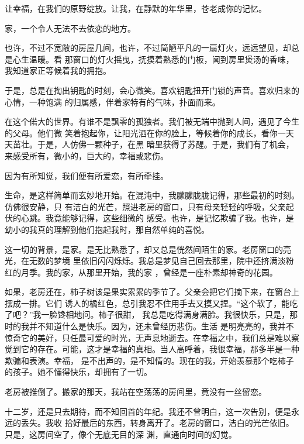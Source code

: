 \documentclass[12pt,a4paper]{article}
\begin{document}
	\endwriting



		让幸福，在我们的原野绽放。让我，在静默的年华里，苍老成你的记忆。

		家，一个令人无法不去依恋的地方。

		也许，不过不宽敞的房屋几间，也许，不过简陋平凡的一扇灯火，远远望见，却总是心生温暖。看
	那窗口的灯火摇曳，抚摸着熟悉的门板，闻到房里煲汤的香味，我知道家正等候着我的拥抱。

		于是，总是在掏出钥匙的时刻，会心微笑。喜欢钥匙扭开门锁的声音。喜欢归来的心情，一种饱满
	的归属感，伴着家特有的气味，扑面而来。

		在这个偌大的世界。有谁不是飘零的孤独者。我们被无端中抛到人间，遇见了今生的父母。他们微
	笑着抱起你，让阳光洒在你的脸上，等候着你的成长，看你一天天茁壮。于是，人仿佛一颗种子，在黑
	暗里获得了苏醒。于是，我们有了机会，来感受所有，微小的，巨大的，幸福或悲伤。

		因为有所知觉，我们便有所爱恋，有所牵挂。

		生命，是这样简单而玄妙地开始。在混沌中，我朦朦胧胧记得，那些最初的时刻。仿佛很安静，只
	有洁白的光芒，照进老房的窗口，只有母亲轻轻的呼吸，父亲起伏的心跳。我竟能够记得，这些细微的
	感受。也许，是记忆欺骗了我。也许，是幼小的我真的理解到他们抱起我时，那自然单纯的喜悦。

		这一切的背景，是家。是无比熟悉了，却又总是恍然间陌生的家。老房窗口的亮光，在无数的梦境
	里依旧闪闪烁烁。我总是梦见自己回去那里，院中还挤满淡粉红的月季。我的家，从那里开始，我的家
	，曾经是一座朴素却神奇的花园。

		如果，老房还在，柿子树该是果实累累的季节了。父亲会把它们摘下来，在窗台上摆成一排。它们
	诱人的橘红色，总引我忍不住用手去又摸又捏。“这个软了，能吃了吧？”我一脸馋相地问。柿子很甜，
	我总是吃得满身满脸。我很快乐，只是，那时的我并不知道什么是快乐。因为，还未曾经历悲伤。生活
	是明亮亮的，我并不惊奇它的美好，只任最可爱的时光，无声息地逝去。在幸福之中，我们总是难以察
	觉到它的存在。可能，这才是幸福的真相。当人高呼着，我很幸福，那多半是一种欺骗和表演。幸福，
	是不出声的，是不知情的。现在的我，开始羡慕那个吃柿子的孩子。她不懂得快乐，却拥有了一切。

		老房被推倒了。搬家的那天，我站在空荡荡的房间里，竟没有一丝留恋。

		十二岁，还是只去期待，而不知回首的年纪。我还不曾明白，这一次告别，便是永远的丢失。我收
	拾好最后的东西，转身离开了。老房的窗口，洁白的光芒依旧。只是，这房间空了，像个无底无目的深
	渊，直通向时间的幻觉。
\end{document}
